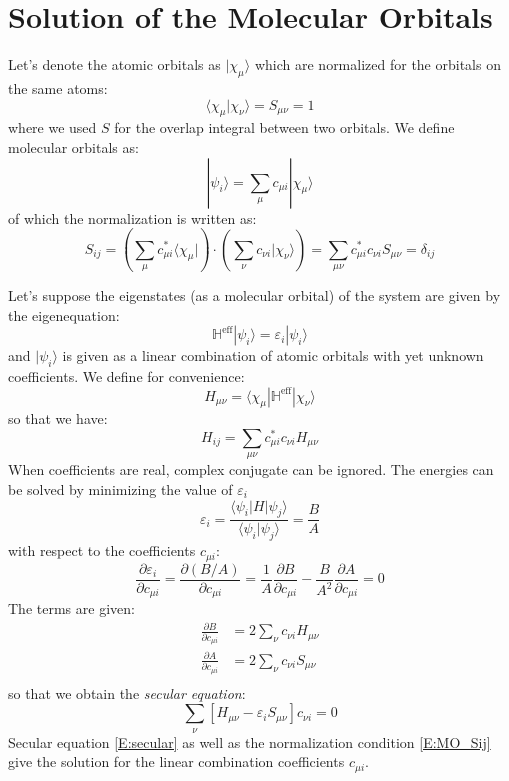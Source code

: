 \documentclass{article}
\newcommand{\heff}{\mathbb{H}^{\text{eff}}}
\newcommand{\pfrac}[2]{\frac{\partial #1}{\partial #2}}
\begin{document}
\section{Solution of the Molecular Orbitals}
Let's denote the atomic orbitals as $|\chi_{\mu}\rangle$ which are normalized for the orbitals on the same atoms:
\[ \langle \chi_{\mu} | \chi_{\nu} \rangle =  S_{\mu\nu} = 1\]
where we used $S$ for the overlap integral between two orbitals. We define molecular orbitals as:
\begin{equation}
    | \psi_i \rangle = \sum_{\mu} c_{\mu i} | \chi_{\mu} \rangle
\end{equation}
of which the normalization is written as:
\begin{equation}
    \label{E:MO_Sij}
    S_{ij} = \left( \sum_{\mu} c_{\mu i}^* \langle \chi_{\mu} | \right) \cdot \left( \sum_{\nu} c_{\nu i} | \chi_{\nu} \rangle \right) = \sum_{\mu\nu} c_{\mu i}^* c_{\nu i} S_{\mu \nu} = \delta_{ij}
\end{equation}

Let's suppose the eigenstates (as a molecular orbital) of the system are given by the eigenequation:
\begin{equation}
    \heff | \psi_i \rangle = \varepsilon_i | \psi_i \rangle
\end{equation}
and $| \psi_i \rangle$ is given as a linear combination of atomic orbitals with yet unknown coefficients. 
We define for convenience:
\[H_{\mu\nu} = \langle \chi_{\mu} | \heff | \chi_{\nu} \rangle\]
so that we have:
\begin{equation}
    \label{E:MO_Hij}
    H_{ij}  = \sum_{\mu\nu} c_{\mu i}^* c_{\nu i} H_{\mu \nu}
\end{equation}
When coefficients are real, complex conjugate can be ignored. The energies can be solved by minimizing the value of $\varepsilon_i$
\begin{equation}
    \varepsilon_i = \frac{\langle \psi_i | H | \psi_j \rangle}{\langle \psi_i | \psi_j \rangle} = \frac{B}{A}
\end{equation}
with respect to the coefficients $c_{\mu i}$:
\begin{equation}
    \pfrac{\varepsilon_i}{c_{\mu i}} = \pfrac{(B/A)}{c_{\mu i}} = \frac{1}{A} \pfrac{B}{c_{\mu i}} - \frac{B}{A^2} \pfrac{A}{c_{\mu i}} = 0
\end{equation}
The terms are given:
\begin{align}
    \pfrac{B}{c_{\mu i}} &= 2 \sum_{\nu} c_{\nu i} H_{\mu \nu} \\
    \pfrac{A}{c_{\mu i}} &= 2 \sum_{\nu} c_{\nu i} S_{\mu \nu} \\
\end{align}
so that we obtain the \emph{secular equation}:
\begin{equation}
    \label{E:secular}
    \sum_{\nu} \left[ H_{\mu\nu} - \varepsilon_i S_{\mu\nu} \right] c_{\nu i} = 0
\end{equation}
Secular equation \eqref{E:secular} as well as the normalization condition \eqref{E:MO_Sij} give the solution 
for the linear combination coefficients $c_{\mu i}$.
\end{document}
